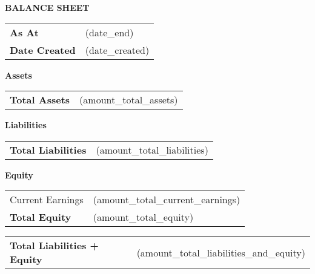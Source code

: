 \documentclass[english]{article}
\providecommand{\tabularnewline}{\\}
\newcommand{\lyxdot}{.}
\begin{document}


\noindent \textbf{BALANCE SHEET}

\noindent \vspace{10mm}


\noindent \begin{tabular}{ll}
\textbf{As At} & (date\_end) \tabularnewline
\textbf{Date Created} & (date\_created) \tabularnewline
\end{tabular}

\noindent \vspace{10mm}

\noindent \textbf{Assets}

\noindent \begin{tabular}{>{\raggedright}p{}>{\raggedright}p{}}
\cline{2-2} 
\textbf{Total Assets} & (amount\_total\_assets)\tabularnewline
\end{tabular}

\noindent \vspace{5mm}


\noindent \textbf{Liabilities}

\noindent \begin{tabular}{>{\raggedright}p{}>{\raggedright}p{}}
\cline{2-2} 
\textbf{Total Liabilities} & (amount\_total\_liabilities)\tabularnewline
\end{tabular}

\noindent \vspace{5mm}


\noindent \textbf{Equity}

\noindent \begin{tabular}{>{\raggedright}p{}>{\raggedright}p{}}
Current Earnings & (amount\_total\_current\_earnings)\tabularnewline
\cline{2-2} 
\textbf{Total Equity} & (amount\_total\_equity)\tabularnewline
\end{tabular}

\noindent \vspace{5mm}


\noindent \begin{tabular}{>{\raggedright}p{}>{\raggedright}p{}}
\textbf{Total Liabilities + Equity} & (amount\_total\_liabilities\_and\_equity)\tabularnewline
\end{tabular}
\end{document}
